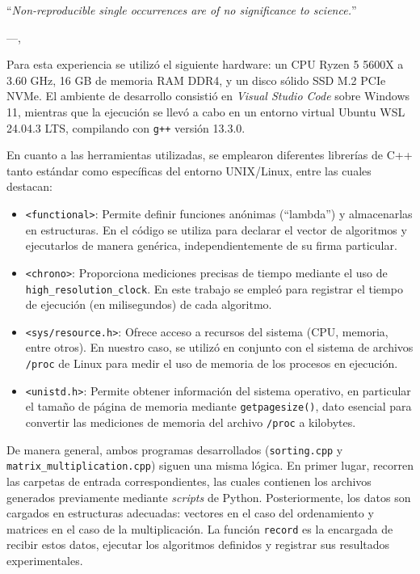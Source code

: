 \epigraph{``\textit{Non-reproducible single occurrences are of no significance to
science.}''}{---\citeauthor{popper2005logic}, \citeyear{popper2005logic} \cite{popper2005logic}}

Para esta experiencia se utilizó el siguiente hardware: un CPU Ryzen 5 5600X a 3.60 GHz, 
16 GB de memoria RAM DDR4, y un disco sólido SSD M.2 PCIe NVMe. 
El ambiente de desarrollo consistió en \textit{Visual Studio Code} sobre Windows 11, 
mientras que la ejecución se llevó a cabo en un entorno virtual Ubuntu 
WSL 24.04.3 LTS, compilando con \texttt{g++} versión 13.3.0. 

En cuanto a las herramientas utilizadas, se emplearon diferentes librerías de C++ tanto estándar 
como específicas del entorno UNIX/Linux, entre las cuales destacan:

\begin{itemize}
    \item \texttt{<functional>}: Permite definir funciones anónimas (``lambda'') y almacenarlas en estructuras. 
    En el código se utiliza para declarar el vector de algoritmos y ejecutarlos de manera genérica, 
    independientemente de su firma particular.
    
    \item \texttt{<chrono>}: Proporciona mediciones precisas de tiempo mediante el uso de 
    \texttt{high\_resolution\_clock}. En este trabajo se empleó para registrar el tiempo de ejecución 
    (en milisegundos) de cada algoritmo.
    
    \item \texttt{<sys/resource.h>}: Ofrece acceso a recursos del sistema (CPU, memoria, entre otros). 
    En nuestro caso, se utilizó en conjunto con el sistema de archivos \texttt{/proc} de Linux 
    para medir el uso de memoria de los procesos en ejecución.
    
    \item \texttt{<unistd.h>}: Permite obtener información del sistema operativo, en particular 
    el tamaño de página de memoria mediante \texttt{getpagesize()}, dato esencial para convertir 
    las mediciones de memoria del archivo \texttt{/proc} a kilobytes.
\end{itemize}

\vspace{0.5em}

De manera general, ambos programas desarrollados (\texttt{sorting.cpp} y 
\texttt{matrix\_multiplication.cpp}) siguen una misma lógica. 
En primer lugar, recorren las carpetas de entrada correspondientes, las cuales contienen los 
archivos generados previamente mediante \textit{scripts} de Python. 
Posteriormente, los datos son cargados en estructuras adecuadas: vectores en el caso del 
ordenamiento y matrices en el caso de la multiplicación. 
La función \texttt{record} es la encargada de recibir estos datos, ejecutar los algoritmos definidos 
y registrar sus resultados experimentales.

